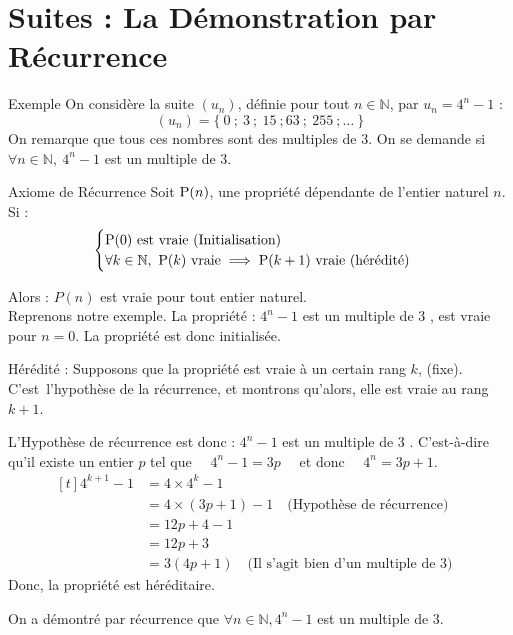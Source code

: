\documentclass{coursbook}
\begin{document}

    \maketitle
    \tableofcontents

    \chapter{Suites : La Démonstration par Récurrence}

    \begin{Gpartie}{Exemple}
        On considère la suite $\left(u_n\right)$, définie pour tout $n\in\mathbb{N}$, par $u_n=4^n-1$ :
            \[\left(u_n\right)=\big\{~0~;~3~;~15~;63~;~255~;\dotsc~\big\}\]
        On remarque que tous ces nombres sont des multiples de 3. On se demande si $\forall n\in\mathbb{N},~4^n-1$ est un multiple de 3.
    \end{Gpartie}
    \begin{Gpartie}{Axiome de Récurrence}
        Soit $\mathrm{P}(n)$, une propriété dépendante de l'entier naturel $n$.\\
        Si :
        \[\begin{cases}
            \mathrm{P}(0)\text{ est vraie (Initialisation)} \\ \forall k\in\mathbb{N},~\mathrm{P}(k)\text{ vraie}\implies\mathrm{P}(k+1)\text{ vraie (hérédité)}
        \end{cases}\]

        Alors : $P(n)$ est vraie pour tout entier naturel. \\[4ex]
        Reprenons notre exemple. La propriété : \og $4^n-1$ est un multiple de 3 \fg{}, est vraie pour $n=0$. La propriété est donc initialisée.
        
        Hérédité : Supposons que la propriété est vraie à un certain rang $k$, (fixe). C'est~l'hypothèse de la récurrence, et montrons qu'alors, elle est vraie au rang $k+1$.
        
        L'Hypothèse de récurrence est donc : \og $4^n-1$ est un multiple de 3 \fg{}. C'est-à-dire qu'il existe un entier $p$ tel que $\quad4^n-1=3p\quad$ et donc $\quad4^n=3p+1$.
        \[\begin{aligned}[t]
            4^{k+1}-1&=4\times 4^k-1 &\\
            &= 4\times\left(3p+1\right)-1 \quad \text{(Hypothèse de récurrence)} &\\
            &=12p+4-1 &\\
            &=12p+3 &\\
            &=3\left(4p+1\right) \quad \text{(Il s'agit bien d'un multiple de 3)}
        \end{aligned}\]
        Donc, la propriété est héréditaire.

        On a démontré par récurrence que $\forall n\in\mathbb{N},4^n-1$ est un multiple de 3.
    \end{Gpartie}
\end{document}
